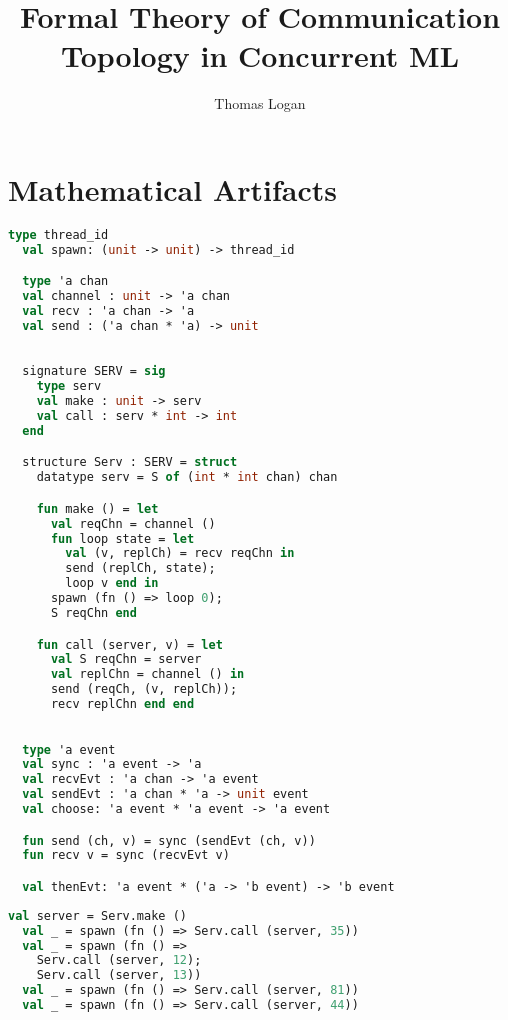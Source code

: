 \documentclass{article}
\title{Formal Theory of Communication Topology in Concurrent ML}
\author{Thomas Logan}
\begin{document}
\maketitle
{}

\newpage
{}

\section{Mathematical Artifacts}

\begin{lstlisting}[language=ML, style=codestyle1]
  type thread_id
  val spawn: (unit -> unit) -> thread_id

  type 'a chan
  val channel : unit -> 'a chan
  val recv : 'a chan -> 'a
  val send : ('a chan * 'a) -> unit
  \end{lstlisting}

\begin{lstlisting}[language=ML, style=codestyle1]

  signature SERV = sig 
    type serv
    val make : unit -> serv
    val call : serv * int -> int
  end

  structure Serv : SERV = struct 
    datatype serv = S of (int * int chan) chan 

    fun make () = let 
      val reqChn = channel ()
      fun loop state = let
        val (v, replCh) = recv reqChn in 
        send (replCh, state);
        loop v end in
      spawn (fn () => loop 0);
      S reqChn end 

    fun call (server, v) = let 
      val S reqChn = server
      val replChn = channel () in 
      send (reqCh, (v, replCh));
      recv replChn end end

  \end{lstlisting}

\begin{lstlisting}[language=ML, style=codestyle1]

  type 'a event
  val sync : 'a event -> 'a
  val recvEvt : 'a chan -> 'a event
  val sendEvt : 'a chan * 'a -> unit event
  val choose: 'a event * 'a event -> 'a event

  fun send (ch, v) = sync (sendEvt (ch, v))
  fun recv v = sync (recvEvt v)

  val thenEvt: 'a event * ('a -> 'b event) -> 'b event

  \end{lstlisting}

\begin{lstlisting}[language=ML, style=codestyle1]
  val server = Serv.make ()
  val _ = spawn (fn () => Serv.call (server, 35))
  val _ = spawn (fn () => 
    Serv.call (server, 12); 
    Serv.call (server, 13))
  val _ = spawn (fn () => Serv.call (server, 81))
  val _ = spawn (fn () => Serv.call (server, 44))
  \end{lstlisting}
\end{document}
